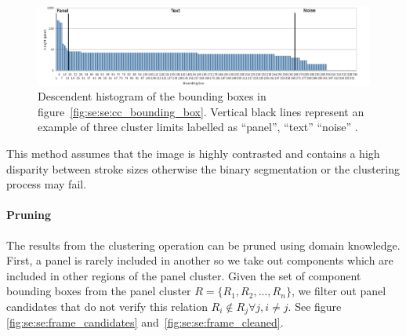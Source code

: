 	\begin{figure}[!ht]	%
	  \centering
		\includegraphics[trim= 5mm 0mm 10mm 0mm, clip,width=1.0\textwidth]{Histogram_en.png}
		\caption{Descendent histogram of the bounding boxes in figure~\ref{fig:se:se:cc_bounding_box}. Vertical black lines represent an example of three cluster limits labelled as ``panel'', ``text'' ``noise'' .}
		\label{fig:se:se:histo_roi}
	\end{figure}

This method assumes that the image is highly contrasted and contains a high disparity between stroke sizes otherwise the binary segmentation or the clustering process may fail.

\paragraph{Pruning} %
\label{par:se:pruning}
The results from the clustering operation can be pruned using domain knowledge.
First, a panel is rarely included in another so 
we take out components which are included in other regions of the panel cluster.  
Given the set of component bounding boxes from the panel cluster $R = \{R_1, R_2, ... , R_n\}$, we filter out panel candidates that do not verify this relation $R_i\notin{R_j} \forall j, i \neq j$.
See figure \ref{fig:se:se:frame_candidates} and~\ref{fig:se:se:frame_cleaned}.

